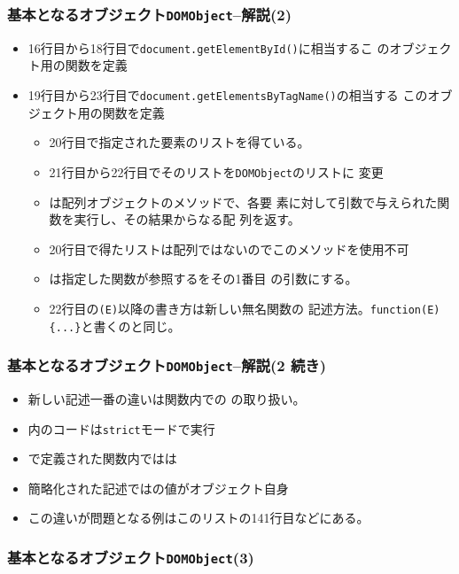  \begin{frame}[containsverbatim]
  \frametitle{基本となるオブジェクト\texttt{DOMObject}--解説(2)}
\begin{itemize}
 \item 16行目から18行目で\texttt{document.getElementById()}に相当するこ
       のオブジェクト用の関数を定義
 \item 19行目から23行目で\texttt{document.getElementsByTagName()}の相当する
       このオブジェクト用の関数を定義
       \begin{itemize}
        \item 20行目で指定された要素のリストを得ている。
        \item 21行目から22行目でそのリストを\texttt{DOMObject}のリストに
              変更
        \item {}は配列オブジェクトのメソッドで、各要
              素に対して引数で与えられた関数を実行し、その結果からなる配
              列を返す。
        \item 20行目で得たリストは配列ではないのでこのメソッドを使用不可
        \item {}は指定した関数が参照するをその1番目
              の引数にする。
        \item 22行目の\texttt{(E)}以降の書き方は新しい無名関数の
              記述方法。\Verb+function(E){...}+と書くのと同じ。
       \end{itemize}
\end{itemize}
 \end{frame}
 \begin{frame}[containsverbatim]
  \frametitle{基本となるオブジェクト\texttt{DOMObject}--解説(2 続き)}
\begin{itemize}
        \item 新しい記述一番の違いは関数内での
              の取り扱い。
        \item {}内のコードは\texttt{strict}モードで実行
        \item {}で定義された関数内ではは
        \item 簡略化された記述ではの値がオブジェクト自身
        \item この違いが問題となる例はこのリストの141行目などにある。
\end{itemize}
 \end{frame}
 \begin{frame}[containsverbatim]
  \frametitle{基本となるオブジェクト\texttt{DOMObject}(3)}
 \end{frame}

